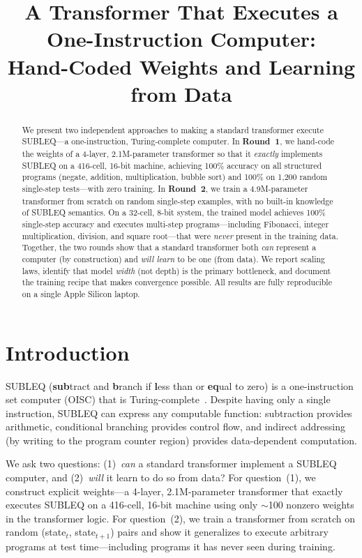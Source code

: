 \documentclass[11pt,a4paper]{article}
\title{\textbf{A Transformer That Executes a One-Instruction Computer:\\Hand-Coded Weights and Learning from Data}}
\author{}
\date{}
\begin{document}
\maketitle

\begin{abstract}
We present two independent approaches to making a standard transformer execute SUBLEQ---a one-instruction, Turing-complete computer.
In \textbf{Round~1}, we hand-code the weights of a 4-layer, 2.1M-parameter transformer so that it \emph{exactly} implements SUBLEQ on a 416-cell, 16-bit machine, achieving 100\% accuracy on all structured programs (negate, addition, multiplication, bubble sort) and 100\% on 1{,}200 random single-step tests---with zero training.
In \textbf{Round~2}, we train a 4.9M-parameter transformer from scratch on random single-step examples, with no built-in knowledge of SUBLEQ semantics.
On a 32-cell, 8-bit system, the trained model achieves 100\% single-step accuracy and executes multi-step programs---including Fibonacci, integer multiplication, division, and square root---that were \emph{never} present in the training data.
Together, the two rounds show that a standard transformer both \emph{can} represent a computer (by construction) and \emph{will learn} to be one (from data).
We report scaling laws, identify that model \emph{width} (not depth) is the primary bottleneck, and document the training recipe that makes convergence possible.
All results are fully reproducible on a single Apple Silicon laptop.
\end{abstract}

\section{Introduction}

SUBLEQ (\textbf{sub}tract and \textbf{b}ranch if \textbf{l}ess than or \textbf{eq}ual to zero) is a one-instruction set computer (OISC) that is Turing-complete~\cite{mavaddat1988}.
Despite having only a single instruction, SUBLEQ can express any computable function: subtraction provides arithmetic, conditional branching provides control flow, and indirect addressing (by writing to the program counter region) provides data-dependent computation.

We ask two questions: (1)~\emph{can} a standard transformer implement a SUBLEQ computer, and (2)~\emph{will} it learn to do so from data?
For question~(1), we construct explicit weights---a 4-layer, 2.1M-parameter transformer that exactly executes SUBLEQ on a 416-cell, 16-bit machine using only $\sim$100 nonzero weights in the transformer logic.
For question~(2), we train a transformer from scratch on random (state$_t$, state$_{t+1}$) pairs and show it generalizes to execute arbitrary programs at test time---including programs it has never seen during training.
\end{document}
